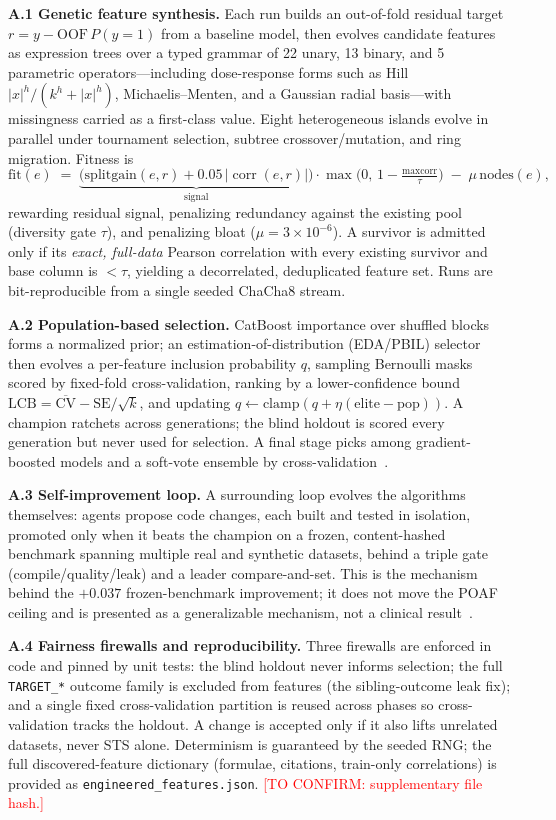 \documentclass[11pt]{article}
\newcommand{\confirm}[1]{\textcolor{red}{[TO CONFIRM: #1]}}
\providecommand{\corr}{\operatorname{corr}}
\begin{document}
\noindent\textbf{A.1 Genetic feature synthesis.} Each run builds an out-of-fold residual
target $r = y - \mathrm{OOF}\,P(y{=}1)$ from a baseline model, then evolves candidate features
as expression trees over a typed grammar of 22 unary, 13 binary, and 5 parametric
operators---including dose-response forms such as Hill $|x|^{h}/(k^{h}+|x|^{h})$,
Michaelis--Menten, and a Gaussian radial basis---with missingness carried as a first-class
value. Eight heterogeneous islands evolve in parallel under tournament selection, subtree
crossover/mutation, and ring migration. Fitness is
\[
\mathrm{fit}(e) \;=\; \underbrace{\big(\mathrm{splitgain}(e,r) + 0.05\,|\corr(e,r)|\big)}_{\text{signal}}\cdot \max\!\Big(0,\,1-\tfrac{\text{maxcorr}}{\tau}\Big)\;-\;\mu\,\mathrm{nodes}(e),
\]
rewarding residual signal, penalizing redundancy against the existing pool (diversity gate
$\tau$), and penalizing bloat ($\mu=3\!\times\!10^{-6}$). A survivor is admitted only if its
\emph{exact, full-data} Pearson correlation with every existing survivor and base column is
$<\tau$, yielding a decorrelated, deduplicated feature set. Runs are bit-reproducible from a
single seeded ChaCha8 stream.

\noindent\textbf{A.2 Population-based selection.} CatBoost importance over shuffled blocks forms
a normalized prior; an estimation-of-distribution (EDA/PBIL) selector then evolves a per-feature
inclusion probability $q$, sampling Bernoulli masks scored by fixed-fold cross-validation,
ranking by a lower-confidence bound $\mathrm{LCB}=\overline{\mathrm{CV}}-\mathrm{SE}/\sqrt{k}$,
and updating $q \leftarrow \mathrm{clamp}(q+\eta(\text{elite}-\text{pop}))$. A champion ratchets
across generations; the blind holdout is scored every generation but never used for selection. A
final stage picks among gradient-boosted models and a soft-vote ensemble by
cross-validation~\cite{catboost2018,chen2016,ke2017,autogluon2020}.

\noindent\textbf{A.3 Self-improvement loop.} A surrounding loop evolves the algorithms
themselves: agents propose code changes, each built and tested in isolation, promoted only when
it beats the champion on a frozen, content-hashed benchmark spanning multiple real and synthetic
datasets, behind a triple gate (compile/quality/leak) and a leader compare-and-set. This is the
mechanism behind the $+0.037$ frozen-benchmark improvement; it does not move the POAF ceiling and
is presented as a generalizable mechanism, not a clinical result~\cite{real2020}.

\noindent\textbf{A.4 Fairness firewalls and reproducibility.} Three firewalls are enforced in
code and pinned by unit tests: the blind holdout never informs selection; the full
\texttt{TARGET\_*} outcome family is excluded from features (the sibling-outcome leak fix); and a
single fixed cross-validation partition is reused across phases so cross-validation tracks the
holdout. A change is accepted only if it also lifts unrelated datasets, never STS alone.
Determinism is guaranteed by the seeded RNG; the full discovered-feature dictionary (formulae,
citations, train-only correlations) is provided as \texttt{engineered\_features.json}.
\confirm{supplementary file hash.}



\end{document}
